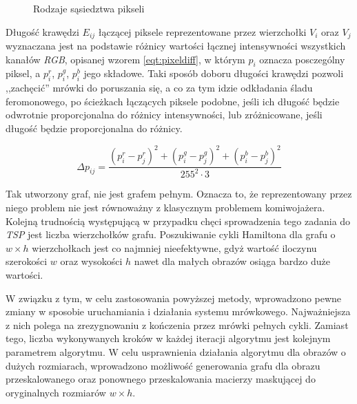 {{{\begin{figure}
                \caption[Rodzaje sąsiedztwa]
                {Rodzaje sąsiedztwa pikseli}
                \label{fig:neighbors}
            \end{figure}

            Długość krawędzi $E_{ij}$ łączącej piksele reprezentowane przez wierzchołki $V_i$ oraz $V_j$ wyznaczana jest
            na podstawie różnicy wartości łącznej intensywności wszystkich kanałów \textit{RGB}, opisanej wzorem
            \ref{eqt:pixeldiff}, w którym $p_i$ oznacza posczególny piksel, a $p_i^r$, $p_i^g$, $p_i^b$ jego składowe.
            Taki sposób doboru długości krawędzi pozwoli ,,zachęcić'' mrówki do poruszania się, a co za tym idzie
            odkładania śladu feromonowego, po ścieżkach łączących piksele podobne, jeśli ich długość będzie odwrotnie
            proporcjonalna do różnicy intensywności, lub zróżnicowane, jeśli długość będzie proporcjonalna do różnicy.

            \begin{equation}\label{eqt:pixeldiff}
                \Delta p_{ij} = \frac{(p_i^r - p_j^r)^2 + (p_i^g - p_j^g)^2 + (p_i^b - p_j^b)^2}{255^2 \cdot 3}
            \end{equation}

            Tak utworzony graf, nie jest grafem pełnym. Oznacza to, że reprezentowany przez niego problem nie jest
            równoważny z klasycznym problemem komiwojażera. Kolejną trudnością występującą w przypadku chęci
            sprowadzenia tego zadania do \textit{TSP} jest liczba wierzchołków grafu. Poszukiwanie cykli Hamiltona dla
            grafu o $w \times h$ wierzchołkach jest co najmniej nieefektywne, gdyż wartość iloczynu szerokości $w$ oraz
            wysokości $h$ nawet dla małych obrazów osiąga bardzo duże wartości.

            W związku z tym, w celu zastosowania powyższej metody, wprowadzono pewne zmiany w sposobie uruchamiania i
            działania systemu mrówkowego. Najważniejsza z nich polega na zrezygnowaniu z kończenia przez mrówki pełnych
            cykli. Zamiast tego, liczba wykonywanych kroków w każdej iteracji algorytmu jest kolejnym parametrem
            algorytmu. W celu usprawnienia działania algorytmu dla obrazów o dużych rozmiarach, wprowadzono
            możliwość generowania grafu dla obrazu przeskalowanego oraz ponownego przeskalowania macierzy maskującej do
            oryginalnych rozmiarów $w \times h$.

}}}
